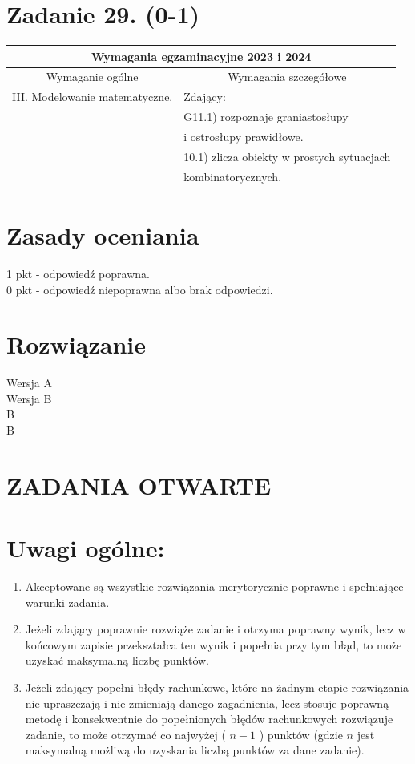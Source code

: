 \documentclass[10pt]{article}
\begin{document}
\section*{Zadanie 29. (0-1)}
\begin{center}
\begin{tabular}{|l|l|}
\hline
\multicolumn{2}{|c|}{Wymagania egzaminacyjne 2023 i 2024} \\
\hline
\multicolumn{1}{|c|}{Wymaganie ogólne} & \multicolumn{1}{c|}{Wymagania szczegółowe} \\
\hline
III. Modelowanie matematyczne. & Zdający: \\
 & G11.1) rozpoznaje graniastosłupy \\
 & i ostrosłupy prawidłowe. \\
 & 10.1) zlicza obiekty w prostych sytuacjach \\
 & kombinatorycznych. \\
\hline
\end{tabular}
\end{center}

\section*{Zasady oceniania}
1 pkt - odpowiedź poprawna.\\
0 pkt - odpowiedź niepoprawna albo brak odpowiedzi.

\section*{Rozwiązanie}
Wersja A\\
Wersja B\\
B\\
B

\section*{ZADANIA OTWARTE}
\section*{Uwagi ogólne:}
\begin{enumerate}
  \item Akceptowane są wszystkie rozwiązania merytorycznie poprawne i spełniające warunki zadania.
  \item Jeżeli zdający poprawnie rozwiąże zadanie i otrzyma poprawny wynik, lecz w końcowym zapisie przekształca ten wynik i popełnia przy tym błąd, to może uzyskać maksymalną liczbę punktów.
  \item Jeżeli zdający popełni błędy rachunkowe, które na żadnym etapie rozwiązania nie upraszczają i nie zmieniają danego zagadnienia, lecz stosuje poprawną metodę i konsekwentnie do popełnionych błędów rachunkowych rozwiązuje zadanie, to może otrzymać co najwyżej ( $n-1$ ) punktów (gdzie $n$ jest maksymalną możliwą do uzyskania liczbą punktów za dane zadanie).
\end{enumerate}
\end{document}
